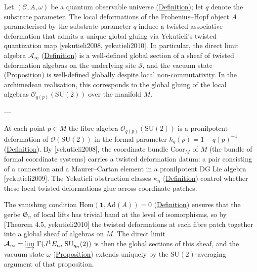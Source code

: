 \begin{proposition}
  \label{prop:global-gluing}
Let $(\mathcal{C}, A, \omega)$ be a quantum observable universe
(\hyperref[def:quantum-observable-universe]{Definition}); let $q$ denote the substrate parameter.  The local
deformations of the Frobenius--Hopf object $A$ parameterised by the
substrate parameter $q$ induce a twisted associative deformation that
admits a unique global gluing via Yekutieli's twisted quantization
map [yekutieli2008, yekutieli2010].  In particular, the direct
limit algebra $\mathcal{A}_\infty$
(\hyperref[def:direct-limit-algebra]{Definition}) is a well-defined global
section of a sheaf of twisted deformation algebras on the underlying
site $\mathcal{S}$, and the vacuum state
(\hyperref[prop:vacuum-state]{Proposition}) is well-defined globally despite
local non-commutativity.  In the archimedean realisation, this
corresponds to the global gluing of the local algebras
$\mathcal{O}_{q(p)}(\mathrm{SU}(2))$ over the manifold $M$.

---

At each point $p \in M$ the fibre algebra
$\mathcal{O}_{q(p)}(\mathrm{SU}(2))$ is a pronilpotent deformation of
$\mathcal{O}(\mathrm{SU}(2))$ in the formal parameter
$\hbar_q(p) = 1 - q(p)^{-1}$
(\hyperref[def:quantum-planck-constant]{Definition}).
By [yekutieli2008], the coordinate bundle $\mathrm{Coor}_M$ of $M$
(the bundle of formal coordinate systems) carries a twisted deformation
datum: a pair consisting of a connection and a Maurer--Cartan element in
a pronilpotent DG Lie algebra [yekutieli2009].  The Yekutieli
obstruction classes $\kappa_n$
(\hyperref[def:quantum-characteristic-classes]{Definition}) control whether
these local twisted deformations glue across coordinate patches.

The vanishing condition
$\mathrm{Hom}(\mathbf{1}, \mathrm{Ad}(A)) = 0$
(\hyperref[def:quantum-observable-universe]{Definition}) ensures that the
gerbe $\mathfrak{G}_n$ of local lifts has trivial band at the level of
isomorphisms, so by [Theorem 4.5, yekutieli2010] the twisted
deformations at each fibre patch together into a global sheaf of
algebras on $M$.  The direct limit $\mathcal{A}_\infty =
\varinjlim\,\Gamma(J^1 E_n,\, \mathrm{SU}_{q_n}(2))$ is then the
global sections of this sheaf, and the vacuum state $\omega$
(\hyperref[prop:vacuum-state]{Proposition}) extends uniquely by the
$\mathrm{SU}(2)$-averaging argument of that proposition.
\end{proposition}
